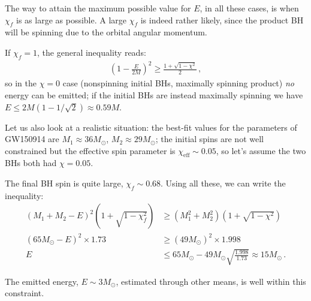 \documentclass[main.tex]{subfiles}
\begin{document}
The way to attain the maximum possible value for \(E\), in all these cases, is when \(\chi _f\) is as large as possible. 
A large \(\chi _f\) is indeed rather likely, since the product BH will be spinning due to the orbital angular momentum. 

If \(\chi _f = 1\), the general inequality reads: 
%
\begin{align}
\left(1 - \frac{E}{2M}\right)^2 \geq \frac{1 + \sqrt{1 - \chi^2}}{2} 
\,,
\end{align}
%
so in the \(\chi = 0\) case (nonspinning initial BHs, maximally spinning product) \emph{no} energy can be emitted; if the initial BHs are instead maximally spinning we have \(E \leq 2M ( 1 - 1/\sqrt{2}) \approx 0.59 M\).

Let us also look at a realistic situation: the best-fit values for the parameters of GW150914 are \(M_1 \approx 36M_{\odot}\), \(M_2 \approx 29M_{\odot}\); the initial spins are not well constrained but the effective spin parameter is \(\chi _{\text{eff}} \sim 0.05\), so let's assume the two BHs both had \(\chi = 0.05\). 

The final BH spin is quite large, \(\chi _f \sim 0.68\). 
Using all these, we can write the inequality: %
\begin{align}
(M_1 + M_2 - E)^2 \left(1 + \sqrt{1 - \chi_f^2}\right) &\geq (M_1^2 + M_2^2 ) \left(1 + \sqrt{1 - \chi^2}\right)  \\
(65 M_{\odot} - E)^2 \times 1.73 &\geq (49 M_{\odot})^2 \times 1.998  \\
E &\leq 65M_{\odot} - 49 M_{\odot} \sqrt{\frac{1.998}{1.73}} \approx 15 M_{\odot}
\,.
\end{align}

The emitted energy, \(E \sim 3M_{\odot}\), estimated through other means, is well within this constraint.
\end{document}
